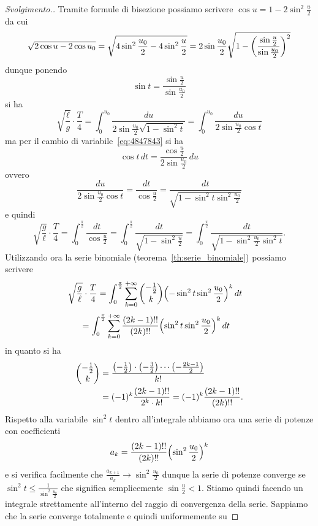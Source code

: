 \begin{proof}[Svolgimento.]
Tramite formule di bisezione possiamo scrivere $\cos u = 1 - 2 \sin^2\frac u 2$
da cui
\[
 \sqrt{2\cos u - 2\cos u_0}
 = \sqrt{4\sin^2 \frac {u_0} 2 - 4 \sin^2 \frac{u}{2}}
 = 2\sin \frac{u_0}2 \sqrt{1-{\left( \frac{\sin \frac u 2}{\sin \frac {u_0}2} \right)}^2}
\]
dunque ponendo
\begin{equation}\label{eq:4847843}
 \sin t = \frac{\sin \frac u 2}{\sin \frac{u_0} 2}
\end{equation}
si ha
\[
  \sqrt{\frac \ell g} \cdot \frac T 4
  =  \int_0^{u_0} \frac{du}{2\sin \frac {u_0}2 \sqrt{1-\sin^2 t}}
  = \int_0^{u_0} \frac{du}{2\sin \frac{u_0}2 \cos t}
\]
ma per il cambio di variabile~\eqref{eq:4847843} si ha
\[
  \cos t \, dt = \frac{\cos \frac u 2 }{2 \sin \frac{u_0} 2}\, du
\]
ovvero
\[
 \frac{du}{2\sin \frac {u_0} 2 \cos t} = \frac{dt}{\cos \frac u 2}
 = \frac{dt}{\sqrt{1-\sin^2 t \sin^2\frac{u_0}{2}}}
\]
e quindi
\[
\sqrt{\frac g \ell} \cdot \frac{T}{4}
= \int_0^{\frac \pi 2} \frac{dt}{\cos \frac u 2}
= \int_0^{\frac \pi 2} \frac{dt}{\sqrt{1-\sin^2 \frac u 2}}
= \int_0^{\frac \pi 2} \frac{dt}{\sqrt{1-\sin^2 \frac{u_0}{2} \sin^2 t}}.
\]
Utilizzando ora la serie binomiale (teorema~\ref{th:serie_binomiale})
possiamo scrivere
\begin{align*}
\sqrt{\frac g \ell} \cdot\frac{T}{4}
&= \int_0^{\frac \pi 2} \sum_{k=0}^{+\infty}{-\frac 1 2 \choose k} {\left( -\sin^2 t\sin^2 \frac{u_0}2 \right)}^{k}\, dt
\end{align*}
\begin{align*}
&= \int_0^{\frac \pi 2} \sum_{k=0}^{+\infty}\frac{(2k-1)!!}{(2k)!!} {\left( \sin^2 t\sin^2 \frac{u_0}2 \right)}^{k}\, dt
\end{align*}
in quanto si ha
\begin{align*}
  {-\frac 1 2 \choose k}
  &= \frac{{\left( -\frac 1 2 \right)}\cdot {\left( -\frac 3 2 \right)} \cdots {\left( -\frac{2k-1} 2 \right)}}{k!}\\
  &= (-1)^k\frac{(2k-1)!!}{2^k \cdot k!} = (-1)^k \frac{(2k-1)!!}{(2k)!!}.
\end{align*}
Rispetto alla variabile $\sin^2 t$ dentro all'integrale abbiamo ora una serie di potenze
con coefficienti
\[
 a_k = \frac{(2k-1)!!}{(2k)!!} {\left( \sin^2\frac{u_0} 2 \right)}^{k}
\]
e si verifica facilmente che
$  \frac{a_{k+1}}{a_k} \to \sin^2 \frac{u_0}{2}$
dunque la serie di potenze converge se
$ \sin^2 t \le \frac{1}{\sin^2 \frac{u_0}{2}}$
che significa semplicemente
$ \sin \frac u 2 < 1$.
Stiamo quindi facendo un integrale strettamente all'interno 
del raggio
di convergenza della serie. Sappiamo che la serie
converge totalmente e quindi uniformemente su

\end{proof}

